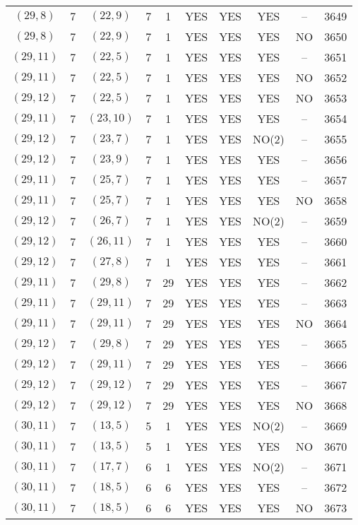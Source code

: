 \begin{longtable}{|c|c|c|c|c|c|c|c|c|c|}
$(29, 8)$ & 7 & $(22, 9)$ & 7 & 1 & YES & YES & YES & -- & 3649\\
$(29, 8)$ & 7 & $(22, 9)$ & 7 & 1 & YES & YES & YES & NO & 3650\\
$(29, 11)$ & 7 & $(22, 5)$ & 7 & 1 & YES & YES & YES & -- & 3651\\
$(29, 11)$ & 7 & $(22, 5)$ & 7 & 1 & YES & YES & YES & NO & 3652\\
$(29, 12)$ & 7 & $(22, 5)$ & 7 & 1 & YES & YES & YES & NO & 3653\\
$(29, 11)$ & 7 & $(23, 10)$ & 7 & 1 & YES & YES & YES & -- & 3654\\
$(29, 12)$ & 7 & $(23, 7)$ & 7 & 1 & YES & YES & NO(2) & -- & 3655\\
$(29, 12)$ & 7 & $(23, 9)$ & 7 & 1 & YES & YES & YES & -- & 3656\\
$(29, 11)$ & 7 & $(25, 7)$ & 7 & 1 & YES & YES & YES & -- & 3657\\
$(29, 11)$ & 7 & $(25, 7)$ & 7 & 1 & YES & YES & YES & NO & 3658\\
$(29, 12)$ & 7 & $(26, 7)$ & 7 & 1 & YES & YES & NO(2) & -- & 3659\\
$(29, 12)$ & 7 & $(26, 11)$ & 7 & 1 & YES & YES & YES & -- & 3660\\
$(29, 12)$ & 7 & $(27, 8)$ & 7 & 1 & YES & YES & YES & -- & 3661\\
$(29, 11)$ & 7 & $(29, 8)$ & 7 & 29 & YES & YES & YES & -- & 3662\\
$(29, 11)$ & 7 & $(29, 11)$ & 7 & 29 & YES & YES & YES & -- & 3663\\
$(29, 11)$ & 7 & $(29, 11)$ & 7 & 29 & YES & YES & YES & NO & 3664\\
$(29, 12)$ & 7 & $(29, 8)$ & 7 & 29 & YES & YES & YES & -- & 3665\\
$(29, 12)$ & 7 & $(29, 11)$ & 7 & 29 & YES & YES & YES & -- & 3666\\
$(29, 12)$ & 7 & $(29, 12)$ & 7 & 29 & YES & YES & YES & -- & 3667\\
$(29, 12)$ & 7 & $(29, 12)$ & 7 & 29 & YES & YES & YES & NO & 3668\\
$(30, 11)$ & 7 & $(13, 5)$ & 5 & 1 & YES & YES & NO(2) & -- & 3669\\
$(30, 11)$ & 7 & $(13, 5)$ & 5 & 1 & YES & YES & YES & NO & 3670\\
$(30, 11)$ & 7 & $(17, 7)$ & 6 & 1 & YES & YES & NO(2) & -- & 3671\\
$(30, 11)$ & 7 & $(18, 5)$ & 6 & 6 & YES & YES & YES & -- & 3672\\
$(30, 11)$ & 7 & $(18, 5)$ & 6 & 6 & YES & YES & YES & NO & 3673\\

\end{longtable}
